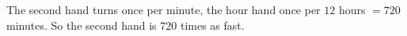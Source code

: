 The second hand turns once per minute, the hour hand once per $12$ hours $=720$ minutes. So the second hand is $\boxed{720}$ times as fast.
